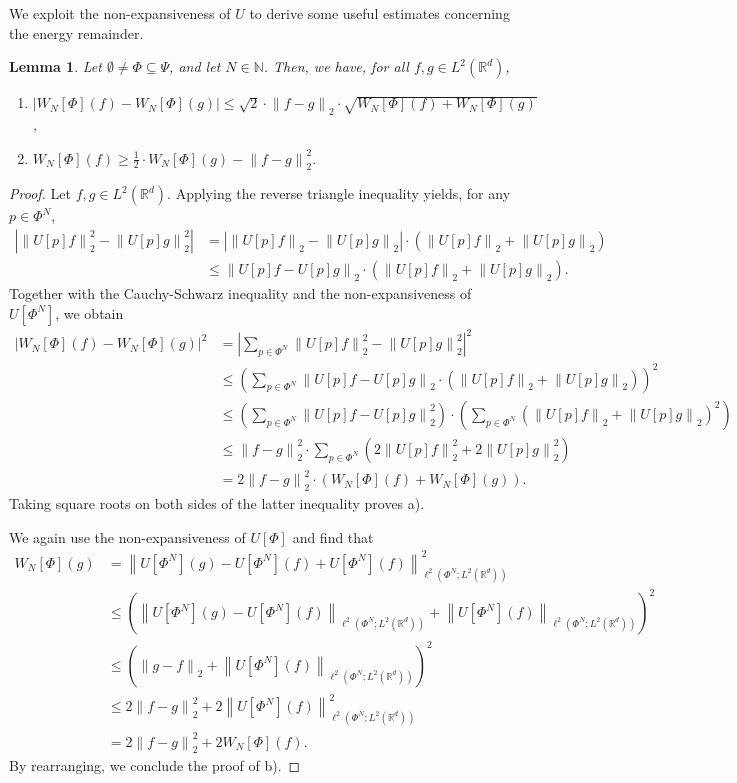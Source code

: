\documentclass[11pt]{amsart}
\newcommand{\R}{{\mathbb{R}}}
\newcommand{\N}{\mathbb{N}}
\newcommand{\norm}[1]{\ensuremath{\left\lVert\text{}#1\text{}\right\rVert}}
\newtheorem{lemma}[theorem]{Lemma}
\newenvironment{proof sketch} {\textit{Proof sketch.}}{}
\newenvironment{myenum}
{ \begin{enumerate}
    \setlength{\itemsep}{3pt}
    \setlength{\parskip}{0pt}
    \setlength{\parsep}{0pt}     }
{ \end{enumerate}                  }
\begin{document}
  We exploit the non-expansiveness of $U$ to derive some useful estimates concerning the energy remainder.
  
  \begin{lemma}\label{lem: Lipschitz-type bounds for W_N} 
    Let $\emptyset \neq \Phi \subseteq \Psi$, and let $N \in \N$. Then, we have, for all $f,g \in L^2(\R^d)$, 
    \begin{myenum}
      \item[a)] $|W_N[\Phi](f)-W_N[\Phi](g)| \leq \sqrt{2} \cdot \norm{f-g}_2 \cdot \sqrt{W_N[\Phi](f)+W_N[\Phi](g)}$,
      \item[b)] $W_N[\Phi](f)\geq \frac{1}{2} \cdot W_N[\Phi](g)-\norm{f-g}_2^2.$
    \end{myenum}
  \end{lemma}
  \begin{proof}
    Let $f,g \in L^2(\R^d)$. Applying the reverse triangle inequality yields, for any $p \in \Phi^N$,
    \begin{align*}
      |\norm{U[p]f}_2^2-\norm{U[p]g}_2^2|&=|\norm{U[p]f}_2-\norm{U[p]g}_2|\cdot (\norm{U[p]f}_2+\norm{U[p]g}_2) \\
      &\leq \norm{U[p]f-U[p]g}_2 \cdot (\norm{U[p]f}_2+\norm{U[p]g}_2). 
    \end{align*}
    Together with the Cauchy-Schwarz inequality and the non-expansiveness of $U[\Phi^N]$, we obtain 
    \begin{align*}
      |W_N[\Phi](f)-W_N[\Phi](g)|^2 &= \left|\sum_{p \in \Phi^N} \norm{U[p]f}_2^2-\norm{U[p]g}_2^2\right|^2 \\
      &\leq \left(\sum_{p \in \Phi^N} \norm{U[p]f-U[p]g}_2 \cdot \left(\norm{U[p]f}_2+\norm{U[p]g}_2\right)\right)^2 \\
      &\leq \left(\sum_{p \in \Phi^N} \norm{U[p]f-U[p]g}_2^2\right) \cdot \left(\sum_{p \in \Phi^N} \left(\norm{U[p]f}_2+\norm{U[p]g}_2\right)^2\right)\\
      &\leq \norm{f-g}_2^2 \cdot \sum_{p \in \Phi^N} \left(2\norm{U[p]f}_2^2+ 2\norm{U[p]g}_2^2\right) \\
      &= 2 \norm{f-g}_2^2 \cdot (W_N[\Phi](f)+W_N[\Phi](g)).
    \end{align*}
    Taking square roots on both sides of the latter inequality proves a).
  
    We again use the non-expansiveness of $U[\Phi]$ and find that
    \begin{align*}
      W_N[\Phi](g)&=\norm{U[\Phi^N](g)-U[\Phi^N](f)+U[\Phi^N](f)}_{\ell^2(\Phi^N;L^2(\R^d))}^2 \\
      &\leq \left(\norm{U[\Phi^N](g)-U[\Phi^N](f)}_{\ell^2(\Phi^N;L^2(\R^d))}+\norm{U[\Phi^N](f)}_{\ell^2(\Phi^N;L^2(\R^d))}\right)^2 \\
      &\leq \left(\norm{g-f}_2+\norm{U[\Phi^N](f)}_{\ell^2(\Phi^N;L^2(\R^d))}\right)^2 \\
      &\leq 2 \norm{f-g}_2^2 + 2 \norm{U[\Phi^N](f)}_{\ell^2(\Phi^N;L^2(\R^d))}^2 \\
      &= 2 \norm{f-g}_2^2 + 2 W_N[\Phi](f).
    \end{align*}
    By rearranging, we conclude the proof of b).
  \end{proof}
  
\end{document}
